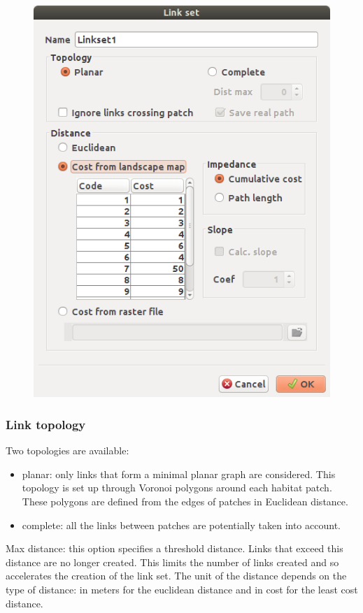 \documentclass{article}
\begin{document}
\begin{figure}[H]
	\includegraphics[scale=0.5]{img/manual-en_img4.png}
\end{figure}


\subsubsection{Link topology}

Two topologies are available: 

\begin{itemize}
	\item planar: only links that form a minimal planar graph are considered. This topology is set up through Voronoi polygons around each habitat patch. These polygons are defined from the edges of patches in Euclidean distance.
	\item complete: all the links between patches are potentially taken into account. 
\end{itemize}

Max distance: this option specifies a threshold distance. Links that exceed this distance are no longer created. This limits the number of links created and so accelerates the creation of the link set. The unit of the distance depends on the type of distance: in meters for the euclidean distance and in cost for the least cost distance.
\end{document}
